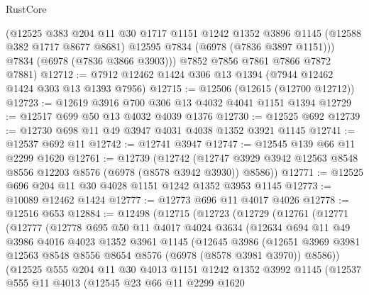 \begin{lexlean}{RustCore}
\begin{coremodule}
        (@12525
          @383
          @204
          @11
          @30
          @1717
          @1151
          @1242
          @1352
          @3896
          @1145
          (@12588 @382 @1717 @8677 @8681)
          @12595
          @7834
          (@6978 (@7836 @3897 @1151)))
        @7834
        (@6978 (@7836 @3866 @3903)))
      @7852
      @7856
      @7861
      @7866
      @7872
      @7881)
@12712 := @7912 @12462 @1424 @306 @13 @1394 (@7944 @12462 @1424 @303 @13 @1393 @7956)
@12715 := @12506 (@12615 (@12700 @12712))
@12723 := @12619 @3916 @700 @306 @13 @4032 @4041 @1151 @1394
@12729 := @12517 @699 @50 @13 @4032 @4039 @1376
@12730 := @12525 @692
@12739 := @12730 @698 @11 @49 @3947 @4031 @4038 @1352 @3921 @1145
@12741 := @12537 @692 @11
@12742 := @12741 @3947
@12747 := @12545 @139 @66 @11 @2299 @1620
@12761 := @12739
    (@12742 (@12747 @3929 @3942 @12563 @8548 @8556 @12203 @8576 (@6978 (@8578 @3942 @3930)) @8586))
@12771 := @12525 @696 @204 @11 @30 @4028 @1151 @1242 @1352 @3953 @1145
@12773 := @10089 @12462 @1424
@12777 := @12773 @696 @11 @4017 @4026
@12778 := @12516 @653
@12884 := @12498
    (@12715
      (@12723
        (@12729
          (@12761
            (@12771
              (@12777
                (@12778
                  @695
                  @50
                  @11
                  @4017
                  @4024
                  @3634
                  (@12634
                    @694
                    @11
                    @49
                    @3986
                    @4016
                    @4023
                    @1352
                    @3961
                    @1145
                    (@12645
                      @3986
                      (@12651
                        @3969
                        @3981
                        @12563
                        @8548
                        @8556
                        @8654
                        @8576
                        (@6978 (@8578 @3981 @3970))
                        @8586))
                    (@12525
                      @555
                      @204
                      @11
                      @30
                      @4013
                      @1151
                      @1242
                      @1352
                      @3992
                      @1145
                      (@12537
                        @555
                        @11
                        @4013
                        (@12545
                          @23
                          @66
                          @11
                          @2299
                          @1620

\end{coremodule}
\end{lexlean}
